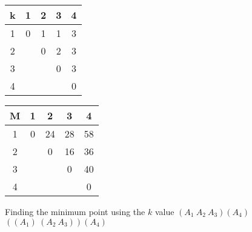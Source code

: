 \documentclass[12pt]{report}
\begin{document}
\begin{table}[h]
	\begin{tabular}{c|c|c|c|c|}
		k&1&2&3&4\\\hline
		1&0&1&1&3\\\hline
		2&&0&2&3\\\hline
		3&&&0&3\\\hline
		4&&&&0\\\hline
	\end{tabular}
	\qquad
	\begin{tabular}{c|c|c|c|c|}
		M&1&2&3&4\\\hline
		1&0&24&28&58\\\hline
		2&&0&16&36\\\hline
		3&&&0&40\\\hline
		4&&&&0\\\hline
	\end{tabular}
\end{table}
Finding the minimum point using the $k$ value
$(A_1~ A_2 ~ A_3)(A_4)$\\
$((A_1)~ (A_2 ~ A_3))(A_4)$\\


\end{document}
